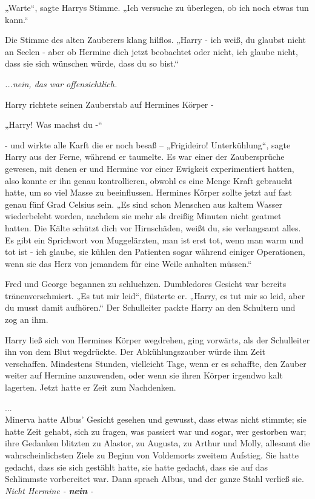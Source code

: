 {„Warte“, sagte Harrys Stimme. „Ich versuche zu überlegen, ob ich noch etwas tun kann.“

Die Stimme des alten Zauberers klang hilflos. „Harry - ich weiß, du glaubst nicht an Seelen - aber ob Hermine dich jetzt beobachtet oder nicht, ich glaube nicht, dass sie sich wünschen würde, dass du so bist.“

\emph{...nein, das war offensichtlich.}

Harry richtete seinen Zauberstab auf Hermines Körper -

„Harry! Was machst du -“

- und wirkte alle Karft die er noch besaß -- „Frigideiro! Unterkühlung“, sagte Harry aus der Ferne, während er taumelte. Es war einer der Zaubersprüche gewesen, mit denen er und Hermine vor einer Ewigkeit experimentiert hatten, also konnte er ihn genau kontrollieren, obwohl es eine Menge Kraft gebraucht hatte, um so viel Masse zu beeinflussen. Hermines Körper sollte jetzt auf fast genau fünf Grad Celsius sein. „Es sind schon Menschen aus kaltem Wasser wiederbelebt worden, nachdem sie mehr als dreißig Minuten nicht geatmet hatten. Die Kälte schützt dich vor Hirnschäden, weißt du, sie verlangsamt alles. Es gibt ein Sprichwort von Muggelärzten, man ist erst tot, wenn man warm und tot ist - ich glaube, sie kühlen den Patienten sogar während einiger Operationen, wenn sie das Herz von jemandem für eine Weile anhalten müssen.“

Fred und George begannen zu schluchzen. Dumbledores Gesicht war bereits tränenverschmiert. „Es tut mir leid“, flüsterte er. „Harry, es tut mir so leid, aber du musst damit aufhören.“ Der Schulleiter packte Harry an den Schultern und zog an ihm.

Harry ließ sich von Hermines Körper wegdrehen, ging vorwärts, als der Schulleiter ihn von dem Blut wegdrückte. Der Abkühlungszauber würde ihm Zeit verschaffen. Mindestens Stunden, vielleicht Tage, wenn er es schaffte, den Zauber weiter auf Hermine anzuwenden, oder wenn sie ihren Körper irgendwo kalt lagerten. Jetzt hatte er Zeit zum Nachdenken.

...\\ Minerva hatte Albus' Gesicht gesehen und gewusst, dass etwas nicht stimmte; sie hatte Zeit gehabt, sich zu fragen, was passiert war und sogar, wer gestorben war; ihre Gedanken blitzten zu Alastor, zu Augusta, zu Arthur und Molly, allesamt die wahrscheinlichsten Ziele zu Beginn von Voldemorts zweitem Aufstieg. Sie hatte gedacht, dass sie sich gestählt hatte, sie hatte gedacht, dass sie auf das Schlimmste vorbereitet war. Dann sprach Albus, und der ganze Stahl verließ sie.\\ \emph{Nicht Hermine -} \textbf{\emph{nein}} \emph{-}

}
